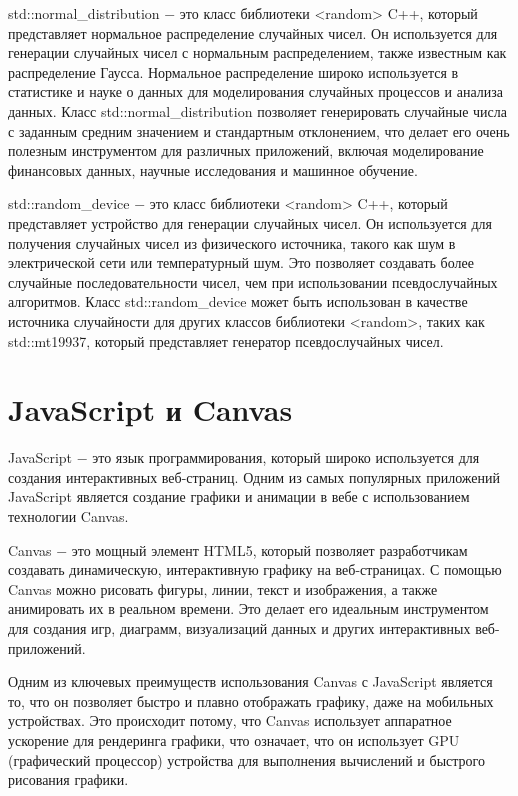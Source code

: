 std::normal\_distribution $-$ это класс библиотеки <random> C++, который представляет нормальное распределение случайных чисел. Он используется для генерации случайных чисел с нормальным распределением, также известным как распределение Гаусса. Нормальное распределение широко используется в статистике и науке о данных для моделирования случайных процессов и анализа данных. Класс std::normal\_distribution позволяет генерировать случайные числа с заданным средним значением и стандартным отклонением, что делает его очень полезным инструментом для различных приложений, включая моделирование финансовых данных, научные исследования и машинное обучение. \cite{CPPREF}

std::random\_device $-$ это класс библиотеки <random> C++, который представляет устройство для генерации случайных чисел. Он используется для получения случайных чисел из физического источника, такого как шум в электрической сети или температурный шум. Это позволяет создавать более случайные последовательности чисел, чем при использовании псевдослучайных алгоритмов. Класс std::random\_device может быть использован в качестве источника случайности для других классов библиотеки <random>, таких как std::mt19937, который представляет генератор псевдослучайных чисел. \cite{CPPREF}

\section{JavaScript и Canvas}

JavaScript $-$ это язык программирования, который широко используется для создания интерактивных веб-страниц. \cite{JSD} Одним из самых популярных приложений JavaScript является создание графики и анимации в вебе с использованием технологии Canvas.

Canvas $-$ это мощный элемент HTML5, который позволяет разработчикам создавать динамическую, интерактивную графику на веб-страницах. С помощью Canvas можно рисовать фигуры, линии, текст и изображения, а также анимировать их в реальном времени. Это делает его идеальным инструментом для создания игр, диаграмм, визуализаций данных и других интерактивных веб-приложений. \cite{CAND}

Одним из ключевых преимуществ использования Canvas с JavaScript является то, что он позволяет быстро и плавно отображать графику, даже на мобильных устройствах. Это происходит потому, что Canvas использует аппаратное ускорение для рендеринга графики, что означает, что он использует GPU (графический процессор) устройства для выполнения вычислений и быстрого рисования графики.

